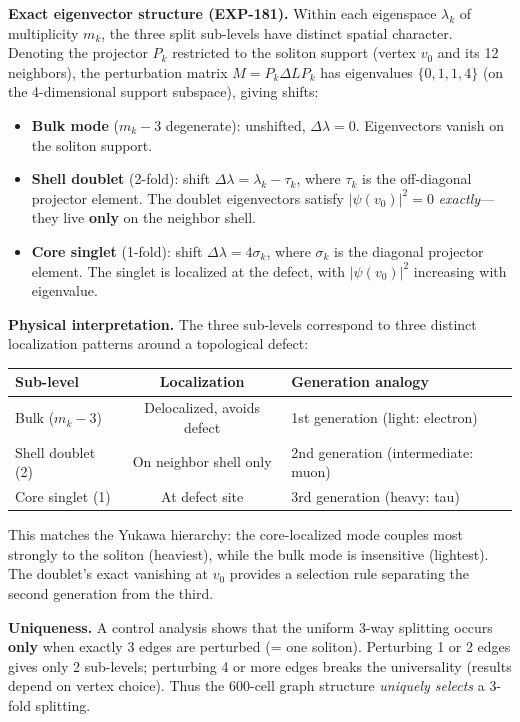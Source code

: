 \documentclass[12pt,a4paper]{article}
\begin{document}
\textbf{Exact eigenvector structure (EXP-181).} Within each eigenspace $\lambda_k$ of multiplicity $m_k$, the three split sub-levels have distinct spatial character. Denoting the projector $P_k$ restricted to the soliton support (vertex $v_0$ and its 12 neighbors), the perturbation matrix $M = P_k \Delta L P_k$ has eigenvalues $\{0, 1, 1, 4\}$ (on the 4-dimensional support subspace), giving shifts:

\begin{itemize}
    \item \textbf{Bulk mode} ($m_k - 3$ degenerate): unshifted, $\Delta\lambda = 0$. Eigenvectors vanish on the soliton support.
    \item \textbf{Shell doublet} (2-fold): shift $\Delta\lambda = \lambda_k - \tau_k$, where $\tau_k$ is the off-diagonal projector element. The doublet eigenvectors satisfy $|\psi(v_0)|^2 = 0$ \emph{exactly}---they live \textbf{only} on the neighbor shell.
    \item \textbf{Core singlet} (1-fold): shift $\Delta\lambda = 4\sigma_k$, where $\sigma_k$ is the diagonal projector element. The singlet is localized at the defect, with $|\psi(v_0)|^2$ increasing with eigenvalue.
\end{itemize}

\textbf{Physical interpretation.} The three sub-levels correspond to three distinct localization patterns around a topological defect:
\begin{center}
\begin{tabular}{lcl}
\textbf{Sub-level} & \textbf{Localization} & \textbf{Generation analogy} \\
\hline
Bulk ($m_k - 3$) & Delocalized, avoids defect & 1st generation (light: electron) \\
Shell doublet (2) & On neighbor shell only & 2nd generation (intermediate: muon) \\
Core singlet (1) & At defect site & 3rd generation (heavy: tau) \\
\end{tabular}
\end{center}

This matches the Yukawa hierarchy: the core-localized mode couples most strongly to the soliton (heaviest), while the bulk mode is insensitive (lightest). The doublet's exact vanishing at $v_0$ provides a selection rule separating the second generation from the third.

\textbf{Uniqueness.} A control analysis shows that the uniform 3-way splitting occurs \textbf{only} when exactly 3 edges are perturbed (= one soliton). Perturbing 1 or 2 edges gives only 2 sub-levels; perturbing 4 or more edges breaks the universality (results depend on vertex choice). Thus the 600-cell graph structure \emph{uniquely selects} a 3-fold splitting.
\end{document}
